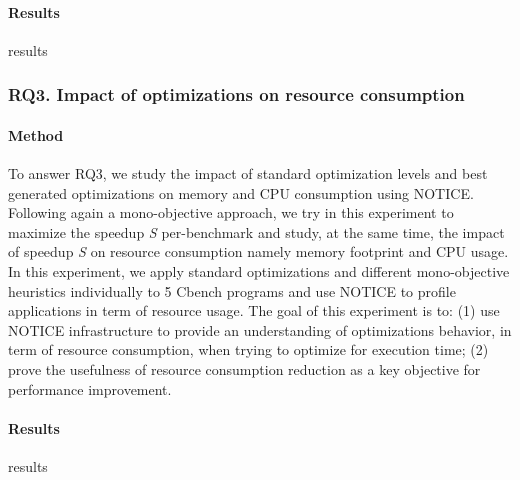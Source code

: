 \paragraph{Results}
results

\noindent{}
\subsubsection{RQ3. Impact of optimizations on resource consumption}
\paragraph{Method}
To answer RQ3, we study the impact of standard optimization levels and best generated optimizations on memory and CPU consumption using NOTICE. Following again a mono-objective approach, we try in this experiment to maximize the speedup \textit{S} per-benchmark and study, at the same time, the impact of speedup \textit{S} on resource consumption namely memory footprint and CPU usage. 
In this experiment, we apply standard optimizations and different mono-objective heuristics individually to 5 Cbench programs and use NOTICE to profile applications in term of resource usage.   
The goal of this experiment is to: (1) use NOTICE infrastructure to provide an understanding of optimizations behavior, in term of resource consumption, when trying to optimize for execution time; (2) prove the usefulness of resource consumption reduction as a key objective for performance improvement.




\paragraph{Results}

results

